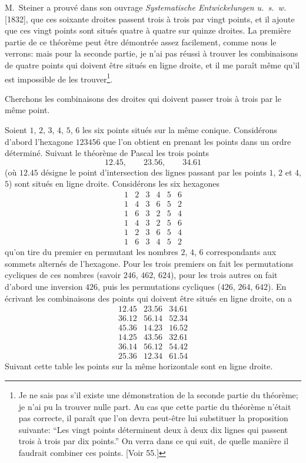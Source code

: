 \documentclass[12pt,a4paper]{article}
\theoremstyle{plain}
\begin{document}
M.~Steiner a prouv\'e dans son ouvrage \textit{Systematische Entwickelungen u.~s.~w.} [1832], que ces soixante droites passent trois \`a trois par vingt points, et il ajoute que ces vingt points sont situ\'es quatre \`a quatre sur quinze droites. La premi\`ere partie de ce th\'eor\`eme peut \^etre d\'emontr\'ee assez facilement, comme nous le verrons: mais pour la seconde partie, je n'ai pas r\'eussi \`a trouver les combinaisons de quatre points qui doivent \^etre situ\'es en ligne droite, et il me para\^it m\^eme qu'il est impossible de les trouver\footnote{Je ne sais pas s'il existe une d\'emonstration de la seconde partie du th\'eor\`eme; je n'ai pu la trouver nulle part. Au cas que cette partie du th\'eor\`eme n'\'etait pas correcte, il para\^it que l'on devra peut-\^etre lui substituer la proposition suivante: ``Les vingt points d\'eterminent deux \`a deux dix lignes qui passent trois \`a trois par dix points.'' On verra dans ce qui suit, de quelle mani\`ere il faudrait combiner ces points. [Voir 55.]}.

Cherchons les combinaisons des droites qui doivent passer trois \`a trois par le m\^eme point.

Soient $1$, $2$, $3$, $4$, $5$, $6$ les six points situ\'es sur la m\^eme conique. Consid\'erons d'abord l'hexagone $123456$ que l'on obtient en prenant les points dans un ordre d\'etermin\'e. Suivant le th\'eor\`eme de Pascal les trois points
\[
12.45,\qquad 23.56,\qquad 34.61
\]
(o\`u $12.45$ d\'esigne le point d'intersection des lignes passant par les points $1$, $2$ et $4$, $5$) sont situ\'es en ligne droite. Consid\'erons les six hexagones
\[
\begin{array}{cccccc}
1 & 2 & 3 & 4 & 5 & 6 \\
1 & 4 & 3 & 6 & 5 & 2 \\
1 & 6 & 3 & 2 & 5 & 4 \\
1 & 4 & 3 & 2 & 5 & 6 \\
1 & 2 & 3 & 6 & 5 & 4 \\
1 & 6 & 3 & 4 & 5 & 2
\end{array}
\]
qu'on tire du premier en permutant les nombres $2$, $4$, $6$ correspondants aux sommets altern\'es de l'hexagone. Pour les trois premiers on fait les permutations cycliques de ces nombres (savoir $246$, $462$, $624$), pour les trois autres on fait d'abord une inversion $426$, puis les permutations cycliques ($426$, $264$, $642$). En \'ecrivant les combinaisons des points qui doivent \^etre situ\'es en ligne droite, on a
\[
\begin{array}{ccc}
12.45 & 23.56 & 34.61 \\
36.12 & 56.14 & 52.34 \\
45.36 & 14.23 & 16.52 \\ \hline
14.25 & 43.56 & 32.61 \\
36.14 & 56.12 & 54.42 \\
25.36 & 12.34 & 61.54
\end{array}
\]
Suivant cette table les points sur la m\^eme horizontale sont en ligne droite.
\end{document}
